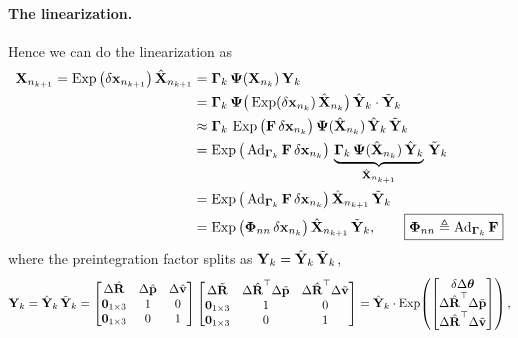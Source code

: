 \paragraph{The linearization.} Hence we can do the linearization as
\begin{align}
\vect{X}_{n_{k+1}} = \Exp\big(\delta\vect{x}_{n_{k+1}}\big)\,\hat{\vect{X}}_{n_{k+1}}
&= \vect{\Gamma}_k\,\vect{\Psi}(\vect{X}_{n_k})\,\vect{Y}_k \\
&= \vect{\Gamma}_k\,\vect{\Psi}\big(\Exp(\delta\vect{x}_{n_k})\,\hat{\vect{X}}_{n_k}\big)\,\hat{\vect{Y}}_k\cdot\tilde{\vect{Y}}_k \\
&\approx \vect{\Gamma}_k\,\Exp\big(\vect{F}\,\delta\vect{x}_{n_k}\big)\,\vect{\Psi}(\hat{\vect{X}}_{n_k})\,\hat{\vect{Y}}_k\,\tilde{\vect{Y}}_k \\
&= \Exp\big(\Ad_{\vect{\Gamma}_k}\vect{F}\,\delta\vect{x}_{n_k}\big)\,\underbrace{\vect{\Gamma}_k\,\vect{\Psi}(\hat{\vect{X}}_{n_k})\,\hat{\vect{Y}}_k}_{\hat{\vect{X}}_{n_{k+1}}}\,\tilde{\vect{Y}}_k \\
&= \Exp\big(\Ad_{\vect{\Gamma}_k}\vect{F}\,\delta\vect{x}_{n_k}\big)\,\hat{\vect{X}}_{n_{k+1}}\,\tilde{\vect{Y}}_k \\
&= \Exp\big(\vect{\Phi}_{nn}\,\delta\vect{x}_{n_k}\big)\,\hat{\vect{X}}_{n_{k+1}}\,\tilde{\vect{Y}}_k,
\qquad
\boxed{\vect{\Phi}_{nn} \triangleq \Ad_{\vect{\Gamma}_k}\vect{F}}
\end{align}
where the preintegration factor splits as $\vect{Y}_k = \hat{\vect{Y}}_k\,\tilde{\vect{Y}}_k$,
\begin{align}
\vect{Y}_k = \hat{\vect{Y}}_k\,\tilde{\vect{Y}}_k =
\begin{bmatrix}
\Delta\hat{\vect{R}} & \Delta\hat{\vect{p}} & \Delta\hat{\vect{v}} \\
\vect{0}_{1\times3} & 1 & 0 \\
\vect{0}_{1\times3} & 0 & 1
\end{bmatrix}
\begin{bmatrix}
\Delta\tilde{\vect{R}} & \Delta\hat{\vect{R}}\trans\Delta\tilde{\vect{p}} & \Delta\hat{\vect{R}}\trans\Delta\tilde{\vect{v}} \\
\vect{0}_{1\times3} & 1 & 0 \\
\vect{0}_{1\times3} & 0 & 1
\end{bmatrix}
= \hat{\vect{Y}}_k\cdot\Exp\!\left(\begin{bmatrix} \delta\Delta\vect{\theta} \\ \Delta\hat{\vect{R}}\trans\Delta\tilde{\vect{p}} \\ \Delta\hat{\vect{R}}\trans\Delta\tilde{\vect{v}} \end{bmatrix}\right),
\end{align}
